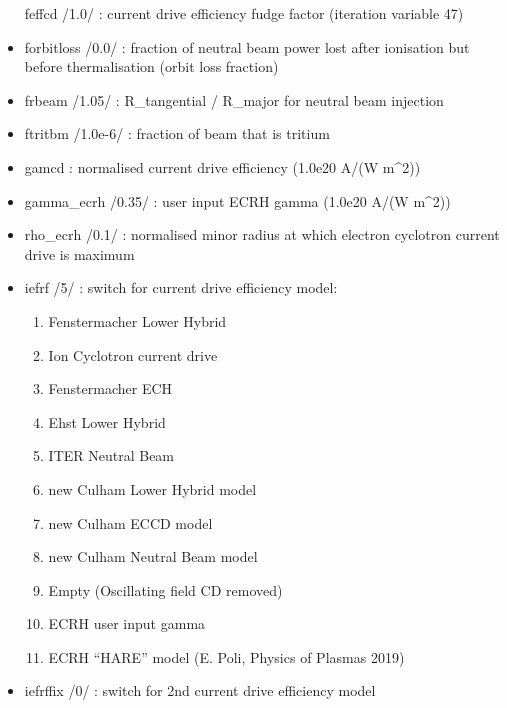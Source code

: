 \documentclass[]{article}
\providecommand{\tightlist}{%
  \setlength{\itemsep}{0pt}\setlength{\parskip}{0pt}}
\begin{document}
\begin{itemize}
  feffcd /1.0/ : current drive efficiency fudge factor (iteration
  variable 47)
\item
  forbitloss /0.0/ : fraction of neutral beam power lost after
  ionisation but before thermalisation (orbit loss fraction)
\item
  frbeam /1.05/ : R\_tangential / R\_major for neutral beam injection
\item
  ftritbm /1.0e-6/ : fraction of beam that is tritium
\item
  gamcd : normalised current drive efficiency (1.0e20 A/(W m\^{}2))
\item
  gamma\_ecrh /0.35/ : user input ECRH gamma (1.0e20 A/(W m\^{}2))
\item
  rho\_ecrh /0.1/ : normalised minor radius at which electron cyclotron
  current drive is maximum
\item
  iefrf /5/ : switch for current drive efficiency model:

  \begin{enumerate}
  \tightlist
  \item
    Fenstermacher Lower Hybrid
  \item
    Ion Cyclotron current drive
  \item
    Fenstermacher ECH
  \item
    Ehst Lower Hybrid
  \item
    ITER Neutral Beam
  \item
    new Culham Lower Hybrid model
  \item
    new Culham ECCD model
  \item
    new Culham Neutral Beam model
  \item
    Empty (Oscillating field CD removed)
  \item
    ECRH user input gamma
  \item
    ECRH ``HARE'' model (E. Poli, Physics of Plasmas 2019)
  \end{enumerate}
\item
  iefrffix /0/ : switch for 2nd current drive efficiency model


\end{itemize}
\end{document}
